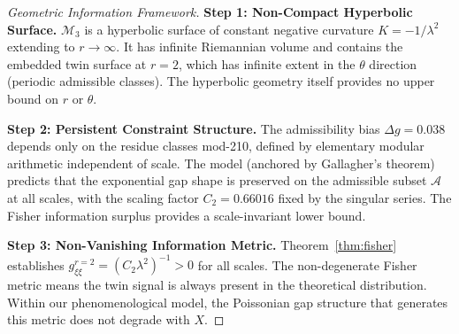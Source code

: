 \documentclass[12pt]{article}
\begin{document}
\begin{proof}[Geometric Information Framework]
\textbf{Step 1: Non-Compact Hyperbolic Surface.}
$\mathcal{M}_3$ is a hyperbolic surface of constant negative curvature
$K = -1/\lambda^2$ extending to $r \to \infty$. It has infinite Riemannian
volume and contains the embedded twin surface at $r=2$, which has infinite
extent in the $\theta$ direction (periodic admissible classes). The hyperbolic
geometry itself provides no upper bound on $r$ or $\theta$.

\textbf{Step 2: Persistent Constraint Structure.}
The admissibility bias $\Delta g = 0.038$ depends only on the residue classes
mod-210, defined by elementary modular arithmetic independent of scale.
The model (anchored by Gallagher's theorem) predicts that the exponential gap
shape is preserved on the admissible subset $\mathcal{A}$ at all scales, with
the scaling factor $C_2 = 0.66016$ fixed by the singular series. The Fisher
information surplus provides a scale-invariant lower bound.

\textbf{Step 3: Non-Vanishing Information Metric.}
Theorem~\ref{thm:fisher} establishes $g_{\xi\xi}^{r=2} = (C_2\lambda^2)^{-1} > 0$
for all scales. The non-degenerate Fisher metric means the twin signal is always
present in the theoretical distribution. Within our phenomenological model, the
Poissonian gap structure that generates this metric does not degrade with $X$.


\end{proof}
\end{document}
